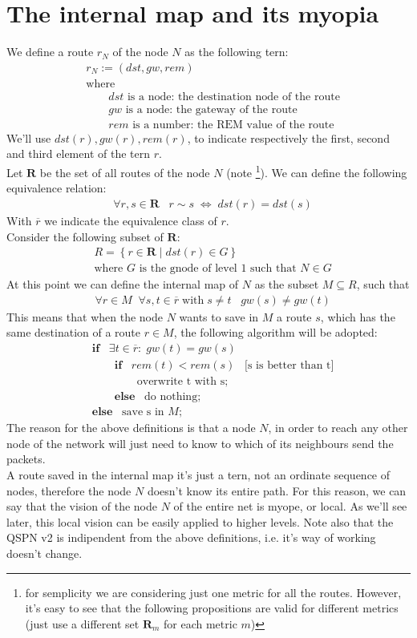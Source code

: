 \documentclass[a4paper]{article}
\newcommand{\T}[1]{\textrm{#1}}
\newcommand{\pgra}[1]{\left\{#1\right\}}
\newcommand{\eal}[1]{{\begin{align*} #1 \end{align*}}}
\def\ove#1{{\overline{#1}}}
\newcommand{\qq}{\qquad}
\def\={{\;\Leftrightarrow\;}}
\def\({{\subseteq}}
\def\'{{\;\;\;}}
\begin{document}
\section{The internal map and its myopia}
\label{sec:intmyopia}
We define a route $r_N$ of the node $N$ as the following tern:
\eal{&r_N:=(dst, gw, rem)\\
&\T{where }\\
&\qq \T{$dst$ is a node: the destination node of the route}\\
&\qq \T{$gw$ is a node: the gateway of the route}\\
&\qq \T{$rem$ is a number: the REM value of the route}
}
We'll use $ dst(r), gw(r), rem(r)$, to indicate respectively the first, second
and third element of the tern $r$.\\
Let $\textbf{R}$ be the set
of all routes of the node $N$ (note \footnote{for semplicity we are considering just one metric for all
the routes. However, it's easy to see that the following
propositions are valid for different metrics (just use a different set
$\textbf{R}_m$ for each metric $m$)}). We can define the following equivalence relation:
\eal{&\forall r,s\in \textbf{R}\;\;\;r\sim s \= dst(r)=dst(s) }
With $\ove r$ we indicate the equivalence class of $r$.\\
Consider the following subset of $\textbf{R}$:
\eal{&R=\pgra{r \in \textbf{R}\;|\;dst(r) \in G}\\
&\T{where $G$ is the gnode of level 1 such that $N\in G$}
}
At this point we can define the internal map of $N$ as the subset $M\( R$, such that
\eal{& \forall r\in M\;\;\forall s,t\in \ove r\;\T{with}\;s\neq t\;\;\; gw(s)\neq gw(t)
}
This means that when the node $N$ wants to save in $M$ a route $s$, which has
the same destination of a route $r\in M$, the following algorithm will be
adopted:
\eal{&\textbf{if}\' \exists t\in \ove r:\;gw(t)=gw(s)\\
&\qq \textbf{if}\' rem(t) < rem(s)\'\T{[s is better than t]}\\
&\qq\qq \T{overwrite t with s;}\\
&\qq \textbf{else}\' \T{do nothing};\\
&\textbf{else}\' \T{save s in $M$;}
}
The reason for the above definitions is that a node $N$, in order 
to reach any other node of the network will just need to know to which of its
neighbours send the packets.\\
A route saved in the internal map it's just a tern, not an ordinate sequence
of nodes, therefore the node $N$ doesn't know its entire path. For this
reason, we can say that the vision of the node $N$ of the entire net is myope,
or local. As we'll see later, this local vision can be easily applied to
higher levels. Note also that the QSPN v2 is indipendent from the above
definitions, i.e. it's way of working doesn't change.
\end{document}
